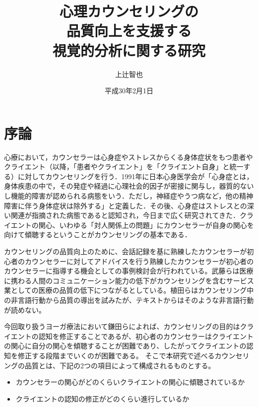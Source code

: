 \documentclass[shuuron]{kuee}
\title{心理カウンセリングの\\品質向上を支援する\\視覚的分析に関する研究}
\author{上辻智也}
\date{平成30年2月1日}
\begin{document}
\maketitle
\tableofcontents


\chapter{序論}



心療において，カウンセラーは心身症やストレスからくる身体症状をもつ患者やクライエント（以降，「患者やクライエント」を「クライエント自身」と統一する）に対してカウンセリングを行う．1991年に日本心身医学会が「心身症とは，身体疾患の中で，その発症や経過に心理社会的因子が密接に関与し，器質的ないし機能的障害が認められる病態をいう．ただし，神経症やうつ病など，他の精神障害に伴う身体症状は除外する」と定義した\cite{shinshinigaku}．その後、心身症はストレスとの深い関連が指摘された病態であると認知され，今日まで広く研究されてきた．クライエントの関心、いわゆる「対人関係上の問題」にカウンセラーが自身の関心を向けて傾聴するということがカウンセリングの基本である\cite{zokad}．







カウンセリングの品質向上のために、会話記録を基に熟練したカウンセラーが初心者のカウンセラーに対してアドバイスを行う熟練したカウンセラーが初心者のカウンセラーに指導する機会としての事例検討会が行われている。武藤ら\cite{武藤清栄2007人間関係やコミュニケーション障害による生産性の低下}は医療に携わる人間のコミュニケーション能力の低下がカウンセリングを含むサービス業としての医療の品質の低下につながるとしている。植田ら\cite{植田一博2006会話の分析とモデル化}はカウンセリング中の非言語行動から品質の導出を試みたが、テキストからはそのような非言語行動が読めない。

今回取り扱うヨーガ療法において鎌田ら\cite{Darshana}によれば、カウンセリングの目的はクライエントの認知を修正することであるが、初心者のカウンセラーはクライエントの関心に自分の関心を傾聴することが困難であり、したがってクライエントの認知を修正する段階までいくのが困難である。
そこで本研究で述べるカウンセリングの品質とは、下記の2つの項目によって構成されるものとする。
\begin{itemize}
  \item カウンセラーの関心がどのくらいクライエントの関心に傾聴されているか
  \item クライエントの認知の修正がどのくらい進行しているか
\end{itemize}
\end{document}
